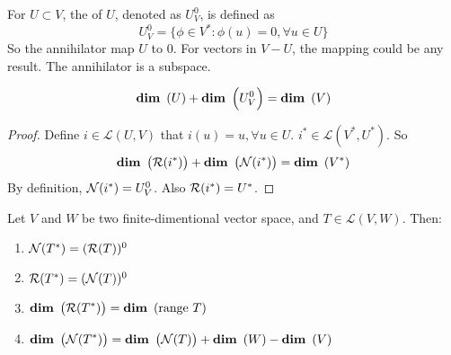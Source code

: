 \begin{definition}
    For $U \subset V$, the  of $U$, denoted as $U^0_V$, is defined as
    \begin{equation*}
        U^0_V = \{ \phi \in V^*: \phi(u) = 0, \forall u \in U \}
    \end{equation*}
    So the annihilator map $U$ to $0$. For vectors in $V - U$, the mapping could be any result. The annihilator is a subspace.
\end{definition}

\begin{theorem}
    \begin{equation}
        \displaystyle \mathop{\bf dim\/}~\left( U \right) + \displaystyle \mathop{\bf dim\/}~\left( U_V^0 \right) = \displaystyle \mathop{\bf dim\/}~\left( V \right)
    \end{equation}
\end{theorem}

\begin{proof}
    Define $i \in \mathcal{L}(U,V)$ that $i(u) = u, \forall u \in U$. $i^* \in \mathcal{L}(V^*,U^*)$. So
    \begin{equation*}
        \displaystyle \mathop{\bf dim\/}~\left( \mathcal{R}(i^*)  \right) +\displaystyle \mathop{\bf dim\/}~\left( \mathcal{N}(i^*) \right) = \displaystyle \mathop{\bf dim\/}~\left( V^* \right)
    \end{equation*}
    By definition, $\mathcal{N}(i^*) = U^0_V$. Also $\mathcal{R}(i^*) = U^*$.
\end{proof}


\begin{theorem}
    Let $V$ and $W$ be two finite-dimentional vector space, and $T \in \mathcal{L}(V,W)$. Then:
    \begin{enumerate}
        \item $\mathcal{N}(T^*)  = (\mathcal{R}(T) )^0$
        \item $\mathcal{R}(T^*) = (\mathcal{N}(T) )^0$
        \item $\displaystyle \mathop{\bf dim\/}~\left( \mathcal{R}(T^*) \right) = \displaystyle \mathop{\bf dim\/}~\left( \text{range } T \right)$
        \item $\displaystyle \mathop{\bf dim\/}~\left( \mathcal{N}(T^*) \right) = \displaystyle \mathop{\bf dim\/}~\left( \mathcal{N}(T) \right) + \displaystyle \mathop{\bf dim\/}~\left( W \right) - \displaystyle \mathop{\bf dim\/}~\left( V \right)$
    \end{enumerate}
\end{theorem}

